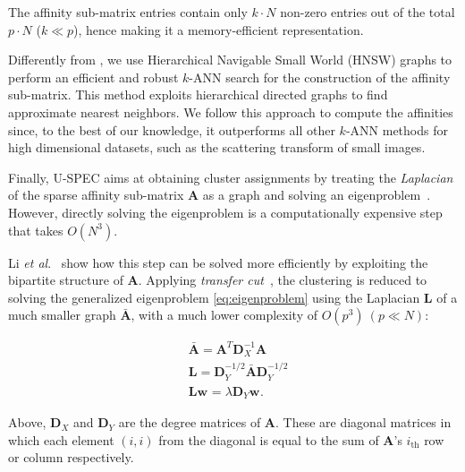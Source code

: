 \documentclass[11pt]{article}
\theoremstyle{definition}
\newcommand{\EtAl}{\textit{et al}}
\newcommand{\Eigenvector}[1]{\mathbf{w}_{#1}}
\newcommand{\Representatives}{p}
\newcommand{\AffinityMatrix}{\mathbf{A}}
\newcommand{\DegreeMatrix}{\mathbf{D}}
\newcommand{\WMatrix}{\bar{\mathbf{A}}}
\newcommand{\Laplacian}{\mathbf{L}}
\begin{document}
The affinity sub-matrix entries contain only $k \cdot N$ non-zero entries out of the total $\Representatives \cdot N$ ($k \ll \Representatives$), hence making it a memory-efficient representation.

Differently from \cite{Huang_UltraScalableSpectralClustering_2019}, we use Hierarchical Navigable Small World (HNSW) graphs \cite{Malkov_HNSWG_2018} to perform an efficient and robust $k$-ANN search for the construction of the affinity sub-matrix. This method exploits hierarchical directed graphs to find approximate nearest neighbors. We follow this approach to compute the affinities since, to the best of our knowledge, it outperforms all other $k$-ANN methods for high dimensional datasets, such as the scattering transform of small images.



Finally, U-SPEC aims at obtaining cluster assignments by treating the \emph{Laplacian} of the sparse affinity sub-matrix $\AffinityMatrix$ as a graph and solving an eigenproblem~\cite{Luxburg_SpectralClusteringTutorial_2007}. However, directly solving the eigenproblem is a computationally expensive step that takes $O(N^3)$. 


Li \EtAl.~\cite{Li_SegmentationUsingSuperpixelsTransferCut_2012} show how this step can be solved more efficiently by exploiting the bipartite structure of $\AffinityMatrix$. Applying \emph{transfer cut}~\cite{Li_SegmentationUsingSuperpixelsTransferCut_2012}, the clustering is reduced to solving the generalized eigenproblem \eqref{eq:eigenproblem} using the Laplacian $\Laplacian$ of a much smaller graph $\WMatrix$, with a much lower complexity of $O(\Representatives^3)~(\Representatives \ll N)$:

\vspace{-0.2cm}
\begin{align}
& \WMatrix = \AffinityMatrix^T \DegreeMatrix_X^{-1} \AffinityMatrix   \label{eq:reduce_graph} \\
& \Laplacian = \DegreeMatrix_Y^{-1/2} \WMatrix \DegreeMatrix_Y^{-1/2} \label{eq:laplacian} \\
& \Laplacian \Eigenvector{} = \lambda \DegreeMatrix_Y \Eigenvector{} \label{eq:eigenproblem}.     
\end{align}

Above, $\DegreeMatrix_X$ and $\DegreeMatrix_Y$ are the degree matrices of $\AffinityMatrix$. These are diagonal matrices in which each element $(i,i)$ from the diagonal is equal to the sum of $\AffinityMatrix$'s $i_{\text{th}}$ row or column respectively. 
\end{document}
